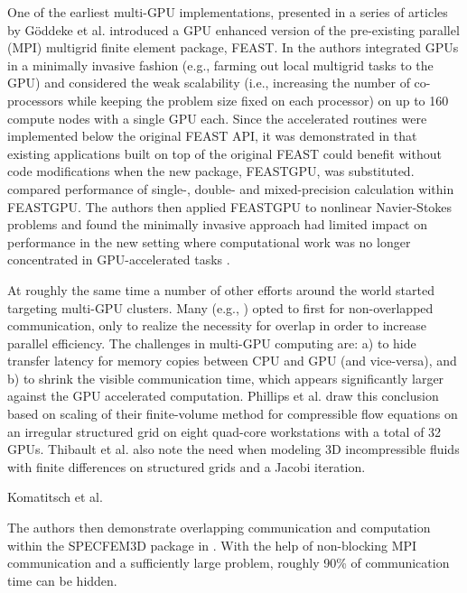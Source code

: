 \documentclass[11pt]{report}
\begin{document}
One of the earliest multi-GPU implementations, presented in a series of articles \cite{Goeddeke2007, Goeddeke2008a, Goeddeke2008b, Goeddeke2009a} by G\"{o}ddeke et al. introduced
a GPU enhanced version of the pre-existing parallel (MPI) multigrid finite element package, FEAST. In \cite{Goeddeke2007} the authors integrated 
GPUs in a minimally invasive fashion (e.g., farming out local multigrid tasks to the GPU) and considered the weak scalability (i.e., 
increasing the number of co-processors while keeping the problem size fixed on each processor) on up to 160 compute nodes with a 
single GPU each.  Since the accelerated routines were implemented below the original FEAST API, it was demonstrated in 
\cite{Goeddeke2008a} that existing applications built on top of the original FEAST could benefit without code modifications when 
the 
new package, FEASTGPU, was substituted. \cite{Goeddeke2008b} compared performance of single-,  double- and 
mixed-precision calculation within FEASTGPU. The authors then applied FEASTGPU to nonlinear Navier-Stokes 
problems and 
found the minimally invasive approach had limited impact on performance in the new setting where computational work was no longer  
concentrated in GPU-accelerated tasks \cite{Goeddeke2009a}. 


At roughly the same time a number of other efforts around the world started targeting multi-GPU clusters. Many (e.g., \cite{Phillips2009, Thibault2009, Komatitsch2009}) opted to first for non-overlapped communication, only to realize the necessity for overlap in order to increase parallel efficiency. The challenges in multi-GPU computing are: a) to hide transfer latency for memory copies between CPU and GPU (and vice-versa), and b) to shrink the visible communication time, which appears significantly larger against the GPU accelerated computation.
Phillips et al. draw this conclusion based on scaling of their finite-volume method for compressible flow equations on an irregular structured grid on eight quad-core workstations with a total of 32 GPUs. 
Thibault et al. \cite{Thibault2009} also note the need when modeling 3D incompressible fluids with finite differences on structured grids and a Jacobi iteration. %

Komatitsch et al. \cite{Komatitsch2009} 

The authors then demonstrate overlapping communication and computation within the SPECFEM3D package in \cite{Komatitsch2010b,Komatitsch2010a}. With the help of non-blocking MPI communication and a sufficiently large problem, roughly 90\% of communication time can be hidden. 
\end{document}
